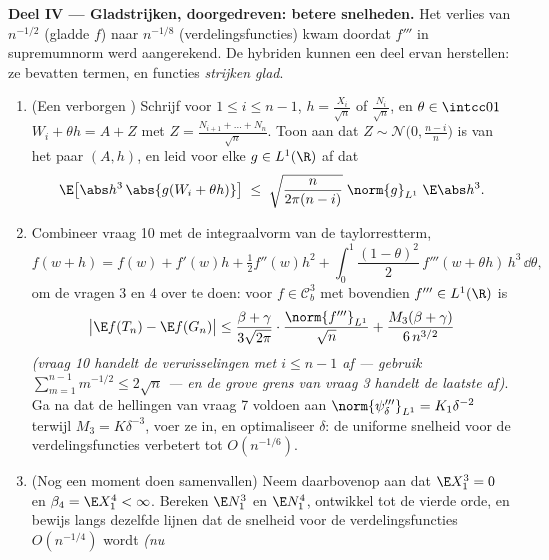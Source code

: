 \begin{problem}
\medskip
\noindent\textbf{Deel IV --- Gladstrijken, doorgedreven: betere
snelheden.} Het verlies van $n^{-1/2}$ (gladde $f$) naar
$n^{-1/8}$ (verdelingsfuncties) kwam doordat $f'''$ in
supremumnorm werd aangerekend. De hybriden kunnen een deel ervan
herstellen: ze bevatten  termen, en  functies
\emph{strijken glad}.
\begin{enumerate}[resume]
  \item (Een verborgen ) Schrijf voor $1 \leq i \leq n
        - 1$, $h = \frac{X_i}{\sqrt n}$ of $\frac{N_i}{\sqrt n}$,
        en $\theta \in \intcc01$ $W_i + \theta h = A + Z$ met $Z
        = \frac{N_{i+1} + \dots + N_n}{\sqrt n}$. Toon aan dat $Z
        \sim \mathcal N\bigl(0, \frac{n-i}n\bigr)$ 
        is van het paar $(A, h)$, en leid voor elke  $g
        \in L^1(\R)$ af dat
        \[
        \E\bigl[\abs h^3\,\abs{g(W_i + \theta h)}\bigr]
        \;\leq\; \sqrt{\frac{n}{2\pi(n - i)}}\;
        \norm{g}_{L^1}\;\E\abs h^3 .
        \]
  \item Combineer vraag 10 met de integraalvorm van de
        taylorrestterm,
        \[
        f(w + h) = f(w) + f'(w)h + \tfrac12f''(w)h^2 +
        \int_0^1\frac{(1 - \theta)^2}2\,f'''(w + \theta
        h)\,h^3\,\dd\theta,
        \]
        om de vragen 3 en 4 over te doen: voor $f \in \mathcal
        C^3_b$ met bovendien $f''' \in L^1(\R)$ is
        \[
        \bigl|\E f(T_n) - \E f(G_n)\bigr| \leq
        \frac{\beta + \gamma}{3\sqrt{2\pi}}\cdot
        \frac{\norm{f'''}_{L^1}}{\sqrt n} +
        \frac{M_3(\beta + \gamma)}{6\,n^{3/2}}
        \]
        \emph{(vraag 10 handelt de verwisselingen met $i \leq n -
        1$ af --- gebruik $\sum_{m=1}^{n-1}m^{-1/2} \leq 2\sqrt
        n$ --- en de grove grens van vraag 3 handelt de laatste
        af)}. Ga na dat de hellingen van vraag 7 voldoen aan
        $\norm{\psi_\delta'''}_{L^1} = K_1\delta^{-2}$ terwijl
        $M_3 = K\delta^{-3}$, voer ze in, en optimaliseer
        $\delta$: de uniforme snelheid voor de
        verdelingsfuncties verbetert tot $O(n^{-1/6})$.
  \item (Nog een moment doen samenvallen) Neem daarbovenop aan
        dat $\E X_1^3 = 0$ en $\beta_4 = \E X_1^4 < \infty$.
        Bereken $\E N_1^3$ en $\E N_1^4$, ontwikkel tot de vierde
        orde, en bewijs langs dezelfde lijnen dat de snelheid
        voor de verdelingsfuncties $O(n^{-1/4})$ wordt \emph{(nu
}
\end{enumerate}
\end{problem}
